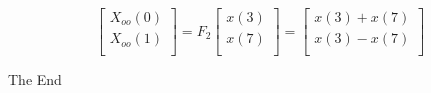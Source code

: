 \documentclass{beamer}
\begin{document}
\begin{frame}
\begin{equation}
\end{equation}
\begin{equation}
\begin{bmatrix}
X_{oo}(0) \\ 
X_{oo}(1)\\ 
\end{bmatrix}
= F_{2}
\begin{bmatrix}
x(3) \\ 
x(7) \\ 
\end{bmatrix}
=
\begin{bmatrix}
x(3)+x(7) \\ 
x(3)-x(7) \\ 
\end{bmatrix}
\end{equation}
\end{frame}

\begin{frame}
\Huge{\centerline{The End}}
\end{frame}

\end{document}
